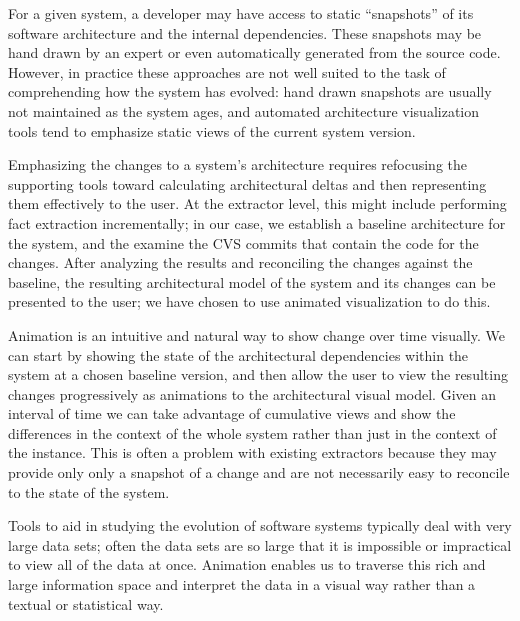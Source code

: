 \documentclass[times, 10pt,twocolumn]{article}
\newcommand{\postgresql}{\emph{PostgreSQL}\xspace}
\begin{document}
For a given system, a developer may have access to static ``snapshots'' of
its software architecture and the internal dependencies.  These snapshots may
be hand drawn by an expert or even automatically generated from the source
code.  However, in practice these approaches are not well suited to the
task of comprehending how the system has evolved: hand drawn snapshots are
usually not maintained as the system ages, and automated architecture
visualization tools tend to emphasize static views of the current system
version.  

Emphasizing the changes to a system's architecture requires refocusing the
supporting tools toward calculating architectural deltas and then
representing them effectively to the user.  At the extractor level, this
might include performing fact extraction incrementally; in our case, we
establish a baseline architecture for the system, and the examine the CVS
commits that contain the code for the changes.  After analyzing the results
and reconciling the changes against the baseline, the resulting
architectural model of the system and its changes can be presented to the
user; we have chosen to use animated visualization to do this.



Animation is an intuitive and natural way to show change over time
visually.  We can start by showing the state of the architectural
dependencies within the system at a chosen baseline version, and then allow
the user to view the resulting changes progressively as animations to the
architectural visual model.  Given an interval of time we can take
advantage of cumulative views and show the differences in the context of
the whole system rather than just in the context of the instance. This is
often a problem with existing extractors because they may provide only only
a snapshot of a change and are not necessarily easy to reconcile to the
state of the system.

Tools to aid in studying the evolution of software systems typically deal
with very large data sets; often the data sets are so large that it is
impossible or impractical to view all of the data at once. Animation
enables us to traverse this rich and large information space and interpret
the data in a visual way rather than a textual or statistical way.
\end{document}
